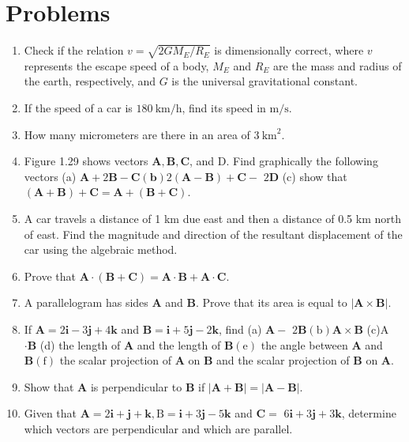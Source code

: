 \documentclass[10pt]{article}
\begin{document}
\section*{Problems}
\begin{enumerate}
  \item Check if the relation $v=\sqrt{2 G M_{E} / R_{E}}$ is dimensionally correct, where $v$ represents the escape speed of a body, $M_{E}$ and $R_{E}$ are the mass and radius of the earth, respectively, and $G$ is the universal gravitational constant.
  \item If the speed of a car is $180 \mathrm{~km} / \mathrm{h}$, find its speed in $\mathrm{m} / \mathrm{s}$.
  \item How many micrometers are there in an area of $3 \mathrm{~km}^{2}$.
  \item Figure 1.29 shows vectors $\mathbf{A}, \mathbf{B}, \mathbf{C}$, and D. Find graphically the following vectors (a) $\mathbf{A}+2 \mathbf{B}-\mathbf{C}(\mathbf{b}) 2(\mathbf{A}-\mathbf{B})+\mathbf{C}-$ $2 \mathbf{D}$ (c) show that $(\mathbf{A}+\mathbf{B})+\mathbf{C}=\mathbf{A}+(\mathbf{B}+\mathbf{C})$.
  \item A car travels a distance of 1 km due east and then a distance of 0.5 km north of east. Find the magnitude and direction of the resultant displacement of the car using the algebraic method.
  \item Prove that $\mathbf{A} \cdot(\mathbf{B}+\mathbf{C})=\mathbf{A} \cdot \mathbf{B}+\mathbf{A} \cdot \mathbf{C}$.
  \item A parallelogram has sides $\mathbf{A}$ and $\mathbf{B}$. Prove that its area is equal to $|\mathbf{A} \times \mathbf{B}|$.
  \item If $\mathbf{A}=2 \mathbf{i}-3 \mathbf{j}+4 \mathbf{k}$ and $\mathbf{B}=\mathbf{i}+5 \mathbf{j}-2 \mathbf{k}$, find (a) $\mathbf{A}-$ $2 \mathbf{B}(\mathrm{b}) \mathbf{A} \times \mathbf{B}$ (c)A $\cdot \mathbf{B}$ (d) the length of $\mathbf{A}$ and the length of $\mathbf{B}(\mathrm{e})$ the angle between $\mathbf{A}$ and $\mathbf{B}(\mathrm{f})$ the scalar projection of $\mathbf{A}$ on $\mathbf{B}$ and the scalar projection of $\mathbf{B}$ on $\mathbf{A}$.
  \item Show that $\mathbf{A}$ is perpendicular to $\mathbf{B}$ if $|\mathbf{A}+\mathbf{B}|=|\mathbf{A}-\mathbf{B}|$.
  \item Given that $\mathbf{A}=2 \mathbf{i}+\mathbf{j}+\mathbf{k}, \mathrm{B}=\mathbf{i}+3 \mathbf{j}-5 \mathbf{k}$ and $\mathbf{C}=$ $6 \mathbf{i}+3 \mathbf{j}+3 \mathbf{k}$, determine which vectors are perpendicular and which are parallel.

\end{enumerate}
\end{document}
